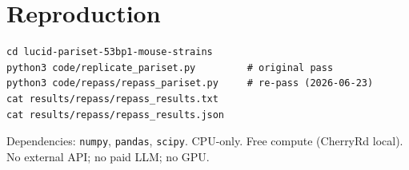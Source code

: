 \documentclass[11pt]{article}
\begin{document}


\section*{Reproduction}
\begin{verbatim}
cd lucid-pariset-53bp1-mouse-strains
python3 code/replicate_pariset.py         # original pass
python3 code/repass/repass_pariset.py     # re-pass (2026-06-23)
cat results/repass/repass_results.txt
cat results/repass/repass_results.json
\end{verbatim}
Dependencies: \texttt{numpy}, \texttt{pandas}, \texttt{scipy}. CPU-only.
Free compute (CherryRd local). No external API; no paid LLM; no GPU.
\end{document}
